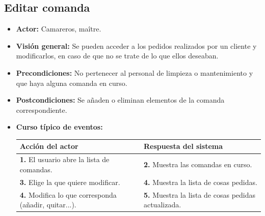 \documentclass[spanish,a4paper,11pt, twoside]{report}	%
\begin{document}
		
	\subsection{Editar comanda}
			\begin{itemize}
			\item \textbf{Actor:} Camareros, maître.
			\item \textbf{Visión general:} Se pueden acceder a los pedidos realizados por un
				cliente y modificarlos, en caso de que no se trate de lo que ellos deseaban.
			\item \textbf{Precondiciones:} No pertenecer al personal de limpieza o
				mantenimiento y que haya alguna comanda en curso.
			\item \textbf{Postcondiciones:} Se añaden o eliminan elementos de la comanda
				correspondiente.
			\item \textbf{Curso típico de eventos:}  \\
				\begin{tabular}{|p{6cm}||p{6cm}|}
				\hline
				\textbf{Acción del actor} & \textbf{Respuesta del sistema} \\ \hline \hline
				\textbf{1.} El usuario abre la lista de comandas. & 
				\textbf{2.} Muestra las comandas en curso.\\ \hline 
				\textbf{3.} Elige la que quiere modificar. & 
				\textbf{4.} Muestra la lista de cosas pedidas. \\ \hline
				\textbf{4.} Modifica lo que corresponda (añadir, quitar...). & 
				\textbf{5.} Muestra la lista de cosas pedidas actualizada. \\ \hline
			\end{tabular}
		\end {itemize}


\end{document}
